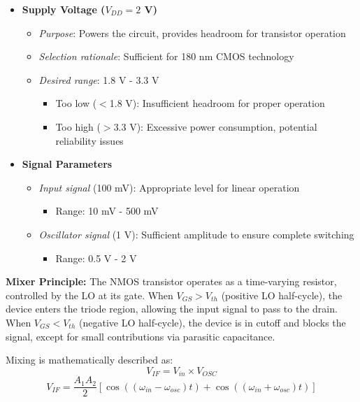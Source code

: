 \begin{itemize}
    \item \textbf{Supply Voltage ($V_{DD} = 2$ V)}
    \begin{itemize}
        \item \textit{Purpose}: Powers the circuit, provides headroom for transistor operation
        \item \textit{Selection rationale}: Sufficient for 180 nm CMOS technology
        \item \textit{Desired range}: 1.8 V - 3.3 V
        \begin{itemize}
            \item Too low ($<$1.8 V): Insufficient headroom for proper operation
            \item Too high ($>$3.3 V): Excessive power consumption, potential reliability issues
        \end{itemize}
    \end{itemize}
    
    \item \textbf{Signal Parameters}
    \begin{itemize}
        \item \textit{Input signal} (100 mV): Appropriate level for linear operation
        \begin{itemize}
            \item Range: 10 mV - 500 mV
        \end{itemize}
        \item \textit{Oscillator signal} (1 V): Sufficient amplitude to ensure complete switching
        \begin{itemize}
            \item Range: 0.5 V - 2 V
        \end{itemize}
    \end{itemize}
\end{itemize}

\textbf{Mixer Principle:}  
The NMOS transistor operates as a time-varying resistor, controlled by the LO at its gate. When $V_{GS} > V_{th}$ (positive LO half-cycle), the device enters the triode region, allowing the input signal to pass to the drain. When $V_{GS} < V_{th}$ (negative LO half-cycle), the device is in cutoff and blocks the signal, except for small contributions via parasitic capacitance.

Mixing is mathematically described as:
$$
V_{IF} = V_{in} \times V_{OSC} 
$$
$$V_{IF}= \frac{A_1 A_2}{2} \left[ \cos((\omega_{in} - \omega_{osc})t) + \cos((\omega_{in} + \omega_{osc})t) \right]$$
 
